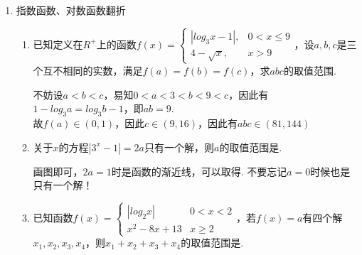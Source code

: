 \begin{enumerate}
\begin{enumerate}
\begin{jieda}
        $\therefore$ 实数 $k$ 的取值范围为 $\left\lbrack  {0,\dfrac{1}{4}}\right\rbrack   \cup  \lbrack 1, + \infty )$
    \end{jieda}
    \item 已知$x$满足不等式$2(\log_{\frac{1}{2}}x)^2+7\log_{\frac{1}{2}}x+3\leq 0$, 
    求$f(x)=\log_2\left(\dfrac{x}{2}\right)\log_2\left(\dfrac{x}{4}\right)$的最大值与最小值.
    \begin{jieda}
    令$t=\log_2x$, 则$2t^2-7t+3\leq 0$, 解得$t\in[\dfrac{1}{2},3]$. \\
    故$y=(t-1)(t-2)=t^2-3t+2=(t-\dfrac{3}{2})^2-\dfrac{1}{4}\in[-\dfrac{1}{4},2]$. \\
    所以$f(x)_{\min}=f(2^{\frac{3}{2}})=-\dfrac{1}{4}$, $f(x)_{\max}=f(8)=2$. 
    \end{jieda}
\end{enumerate}
    \item 指数函数、对数函数翻折
    \begin{enumerate}
        \item 已知定义在$R^{+}$上的函数$f(x) = \left \{\begin{array}{ll}
        |log_3x - 1|, & 0 < x \leq 9 \\
        4-\sqrt{x}, & x > 9
        \end{array} \right.$，设$a, b, c$是三个互不相同的实数，满足$f(a) = f(b) = f(c)$，求$abc$的取值范围.
        \begin{jieda}
            不妨设$a < b < c$，易知$0 < a < 3 < b < 9< c$，因此有$1 - log_3a = log_3b - 1$，即$ab = 9$. \\
            故$f(a) \in (0, 1)$，因此$c \in (9, 16)$，因此有$abc \in (81, 144)$
        \end{jieda}
        \item 关于$x$的方程$|3^x-1| = 2a$只有一个解，则$a$的取值范围是\blkda[3]{$\left[\dfrac{1}{2}, +\infty\right) \cup \{0\}$}.
        \begin{jieda}
            画图即可，$2a = 1$时是函数的渐近线，可以取得. 不要忘记$a = 0$时候也是只有一个解！
        \end{jieda}
    \item 已知函数$f(x) = \left \{ \begin{array}{ll}
        |log_2x| & 0 < x < 2 \\
        x^2 - 8x + 13 & x \geq 2
    \end{array} \right.$，若$f(x) = a$有四个解$x_1, x_2, x_3, x_4$，则$x_1 + x_2 + x_3 + x_4$的取值范围是.
    \begin{jieda}

\end{jieda}
\end{enumerate}
\end{enumerate}
